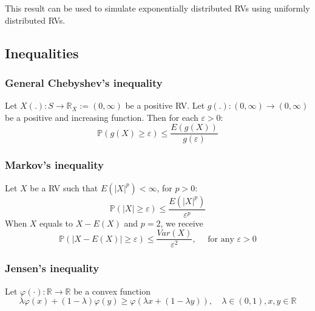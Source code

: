 \documentclass[12pt]{article}
\newcommand{\incfig}[1]{%
\def\svgwidth{\columnwidth}
{#1.pdf_tex}
}
\begin{document}
This result can be used to simulate exponentially distributed RVs using uniformly
distributed RVs.




\subsection{Inequalities}

\subsubsection{General Chebyshev's inequality}
Let $ X(.): S \rightarrow \mathbb{R}_{X}:=(0, \infty ) $ be a positive RV. Let
$ g(.):(0,\infty ) \rightarrow (0,\infty ) $ be a positive and increasing function.
Then for each $ \varepsilon > 0 $:
\begin{equation*}
\mathbb{P}(g(X) \ge  \varepsilon)	\le \frac{E(g(X))}{g(\varepsilon)}
\end{equation*}


\subsubsection{Markov's inequality}
Let $ X $ be a RV such that $ E(\left\lvert X \right\rvert^{p} ) < \infty $, for
$ p > 0 $:
\begin{equation*}
\mathbb{P}(\left\lvert X \right\rvert  \ge  \varepsilon) \le  
\frac{E(\left\lvert X \right\rvert ^{p})}{\varepsilon^{ p}}
\end{equation*}
When $ X $ equals to $ X - E(X) $ and $ p = 2 $, we receive
\begin{equation*}
\mathbb{P}(\left\lvert X - E(X) \right\rvert \ge  \varepsilon ) \le  
\frac{Var(X)}{\varepsilon^{2}}, \quad \text{ for any  } \varepsilon > 0
\end{equation*}


\subsubsection{Jensen's inequality}

Let $ \varphi(\cdot ): \mathbb{R} \rightarrow \mathbb{R}  $ be a convex function
\begin{equation*}
\lambda \varphi(x) + (1 - \lambda)\varphi(y) \ge  \varphi(\lambda x + (1 - \lambda y))
, \quad \lambda \in (0,1), x, y \in \mathbb{R}
\end{equation*}

\begin{figure}[ht]
    \centering
		\scalebox{.5}{\incfig{convex}}
    \label{fig:convex}
\end{figure}
\end{document}
